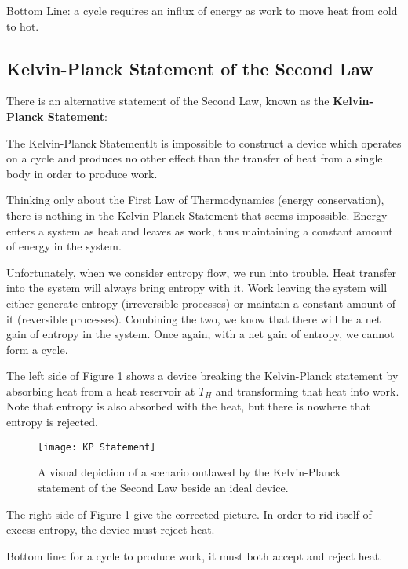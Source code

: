 Bottom Line: a cycle requires an influx of energy as work to move heat from cold to hot.

\subsection{Kelvin-Planck Statement of the Second Law}
There is an alternative statement of the Second Law, known as the {\bf Kelvin-Planck Statement}:

\begin{quoteWithTitle}{The Kelvin-Planck Statement}{It is impossible to construct a device which operates on a cycle and produces no other effect than the transfer of heat from a single body in order to produce work.}
\end{quoteWithTitle}

Thinking only about the First Law of Thermodynamics (energy conservation), there is nothing in the Kelvin-Planck Statement that seems impossible.  Energy enters a system as heat and leaves as work, thus maintaining a constant amount of energy in the system.

Unfortunately, when we consider entropy flow, we run into trouble.  Heat transfer into the system will always bring entropy with it.  Work leaving the system will either generate entropy (irreversible processes) or maintain a constant amount of it (reversible processes). Combining the two, we know that there will be a net gain of entropy in the system.  Once again, with a net gain of entropy, we cannot form a cycle.

The left side of Figure \ref{fig:kelvinPlanck} shows a device breaking the Kelvin-Planck statement by absorbing heat from a heat reservoir at $T_H$ and transforming that heat into work.  Note that entropy is also absorbed with the heat, but there is nowhere that entropy is rejected.
%
\begin{figure}[H]
  \centering
  \texttt{[image: KP Statement]}
  \caption{A visual depiction of a scenario outlawed by the Kelvin-Planck statement of the Second Law beside an ideal device.}
  \label{fig:kelvinPlanck}
\end{figure}%
%
The right side of Figure \ref{fig:kelvinPlanck} give the corrected picture.  In order to rid itself of excess entropy, the device must reject heat.

Bottom line: for a cycle to produce work, it must both accept and reject heat.

